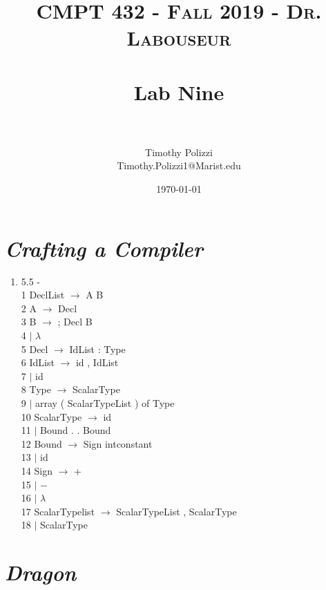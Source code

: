 \documentclass[letterpaper, 10pt]{article}
\title{	
   \normalfont \normalsize 
   \textsc{CMPT 432 - Fall 2019 - Dr. Labouseur} \\[10pt] %
   \horrule{0.5pt} \\[0.25cm] 	%
   \huge Lab Nine\\     	        %
   \horrule{0.5pt} \\[0.25cm] 	%
}
\author{Timothy Polizzi \\ \normalsize Timothy.Polizzi1@Marist.edu}
\date{\normalsize\today} 	%
\begin{document}
\maketitle %


\noindent
\section{\textit{Crafting a Compiler}}

\begin{enumerate}
    
    \item 5.5 - \\
    1 DeclList \tab $\rightarrow$ A B \\
    2 A \tab $\rightarrow$ Decl \\
    3 B \tab $\rightarrow$ ; Decl B \\
    4 \tab $|$ $\lambda$ \\
    5 Decl \tab $\rightarrow$ IdList : Type \\
    6 IdList \tab $\rightarrow$ id , IdList \\
    7 \tab $|$ id \\
    8 Type \tab $\rightarrow$ ScalarType \\
    9 \tab $|$ array ( ScalarTypeList ) of Type \\
    10 ScalarType \tab $\rightarrow$ id \\
    11 \tab $|$ Bound . . Bound \\
    12 Bound \tab $\rightarrow$ Sign intconstant \\
    13 \tab $|$ id \\
    14 Sign \tab $\rightarrow$ + \\
    15 \tab $|$ $-$ \\
    16 \tab $|$ $\lambda$ \\
    17 ScalarTypelist \tab $\rightarrow$ ScalarTypeList , ScalarType \\
    18 \tab $|$ ScalarType \\
    
\end{enumerate}

\section{\textit{Dragon}}
\end{document}
